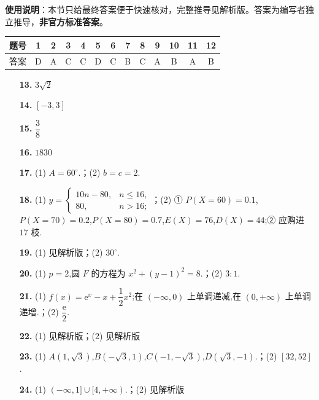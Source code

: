 
\begin{gknotice}
\textbf{使用说明}：本节只给最终答案便于快速核对，完整推导见解析版。答案为编写者独立推导，\textbf{非官方标准答案}。
\end{gknotice}

\begin{center}\begin{tabular}{ccccccccccccc}
\toprule
题号 & 1 & 2 & 3 & 4 & 5 & 6 & 7 & 8 & 9 & 10 & 11 & 12 \\
\midrule
答案 & D & A & C & C & D & C & B & C & A & B & A & B \\
\bottomrule
\end{tabular}\end{center}

\begin{itemize}[leftmargin=2.6em]
  \item[\textbf{13.}] $3\sqrt2$
  \item[\textbf{14.}] $[-3,3]$
  \item[\textbf{15.}] $\dfrac38$
  \item[\textbf{16.}] $1830$
\end{itemize}

\begin{itemize}[leftmargin=2.6em]
  \item[\textbf{17.}] (1) $A=60^\circ$.；(2) $b=c=2$.
  \item[\textbf{18.}] (1) $y=\begin{cases}10n-80,&n\leqslant16,\\80,&n>16;\end{cases}$；(2) ① $P(X=60)=0.1$,$P(X=70)=0.2$,$P(X=80)=0.7$,$E(X)=76$,$D(X)=44$;② 应购进 $17$ 枝.
  \item[\textbf{19.}] (1) 见解析版；(2) $30^\circ$.
  \item[\textbf{20.}] (1) $p=2$,圆 $F$ 的方程为 $x^2+(y-1)^2=8$.；(2) $3:1$.
  \item[\textbf{21.}] (1) $f(x)=\mathrm e^x-x+\dfrac12x^2$;在 $(-\infty,0)$ 上单调递减,在 $(0,+\infty)$ 上单调递增.；(2) $\dfrac{\mathrm e}{2}$.
  \item[\textbf{22.}] (1) 见解析版；(2) 见解析版
  \item[\textbf{23.}] (1) $A(1,\sqrt3)$,$B(-\sqrt3,1)$,$C(-1,-\sqrt3)$,$D(\sqrt3,-1)$.；(2) $[32,52]$.
  \item[\textbf{24.}] (1) $(-\infty,1]\cup[4,+\infty)$.；(2) 见解析版
\end{itemize}
